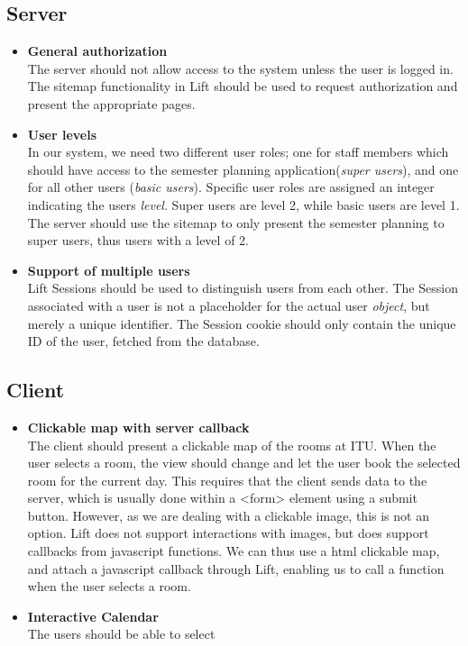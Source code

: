 \subsection{Server}
\label{sub:req_server}
\begin{itemize}
	\item \textbf{General authorization}\\
	The server should not allow access to the system unless the user is logged in. The sitemap functionality in Lift should be used to request authorization and present the appropriate pages.
	\item \textbf{User levels}\\
	In our system, we need two different user roles; one for staff members which should have access to the semester planning application(\emph{super users}), and one for all other users (\emph{basic users}). Specific user roles are assigned an integer indicating the users \emph{level}. Super users are level 2, while basic users are level 1. The server should use the sitemap to only present the semester planning to super users, thus users with a level of 2. 
	\item \textbf{Support of multiple users}\\
	Lift Sessions should be used to distinguish users from each other. The Session associated with a user is not a placeholder for the actual user \emph{object}, but merely a unique identifier. The Session cookie should only contain the unique ID of the user, fetched from the database.
\end{itemize}

\subsection{Client}
\label{sub:req_client}
\begin{itemize}
	\item \textbf{Clickable map with server callback}\\
	The client should present a clickable map of the rooms at ITU. When the user selects a room, the view should change and let the user book the selected room for the current day. This requires that the client sends data to the server, which is usually done within a <form> element using a submit button. However, as we are dealing with a clickable image, this is not an option. Lift does not support interactions with images, but does support callbacks from javascript functions. We can thus use a html clickable map\cite{html_map}, and attach a javascript callback through Lift, enabling us to call a function when the user selects a room.
	\item \textbf{Interactive Calendar}\\
	The users should be able to select 
\end{itemize}

